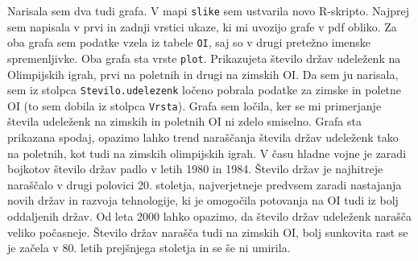 \documentclass[11pt,a4paper]{article}
\begin{document}
Narisala sem dva tudi grafa. V mapi \verb|slike| sem ustvarila novo R-skripto. Najprej sem napisala v prvi in zadnji vrstici ukaze, ki mi uvozijo grafe v pdf obliko. Za oba grafa sem podatke vzela iz tabele \verb|OI|, saj so v drugi pretežno imenske spremenljivke.
Oba grafa sta vrste \verb|plot|. Prikazujeta število držav udeleženk na Olimpijskih igrah, prvi na poletnih in drugi na zimskih OI. Da sem ju narisala, sem iz stolpca \verb|Stevilo.udelezenk| ločeno pobrala podatke za zimske in poletne OI (to sem dobila iz stolpca \verb|Vrsta|). Grafa sem ločila, ker se mi primerjanje števila udeleženk na zimskih in poletnih OI ni zdelo smiselno.
\newline
Grafa sta prikazana spodaj, opazimo lahko trend naraščanja števila držav udeleženk tako na poletnih, kot tudi na zimskih olimpijskih igrah. V času hladne vojne je zaradi bojkotov število držav padlo v letih 1980 in 1984. Število držav je najhitreje naraščalo v drugi polovici 20. stoletja, najverjetneje predvsem zaradi nastajanja novih držav in razvoja tehnologije, ki je omogočila potovanja na OI tudi iz bolj oddaljenih držav. Od leta 2000 lahko opazimo, da število držav udeleženk narašča veliko počasneje. \newline
Število držav narašča tudi na zimskih OI, bolj sunkovita rast se je začela v 80. letih prejšnjega stoletja in se še ni umirila.
 


\end{document}
